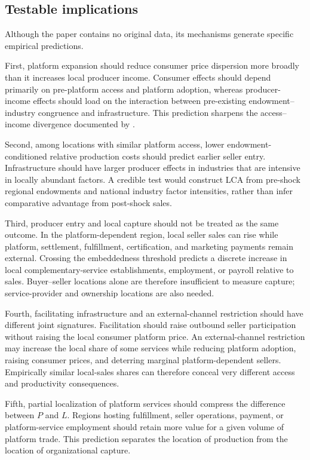 \documentclass[11pt]{article}
\theoremstyle{definition}
\theoremstyle{remark}
\begin{document}
\subsection{Testable implications}

Although the paper contains no original data, its mechanisms generate
specific empirical predictions.

First, platform expansion should reduce consumer price dispersion more
broadly than it increases local producer income.  Consumer effects should
depend primarily on pre-platform access and platform adoption, whereas
producer-income effects should load on the interaction between pre-existing
endowment--industry congruence and infrastructure.  This prediction sharpens
the access--income divergence documented by
\citet{CoutureFaberGuLiu2021}.

Second, among locations with similar platform access, lower
endowment-conditioned relative production costs should predict earlier
seller entry.  Infrastructure should have larger producer effects in
industries that are intensive in locally abundant factors.  A credible test
would construct LCA from pre-shock regional endowments and national industry
factor intensities, rather than infer comparative advantage from post-shock
sales.

Third, producer entry and local capture should not be treated as the same
outcome.  In the platform-dependent region, local seller sales can rise while
platform, settlement, fulfillment, certification, and marketing payments
remain external.  Crossing the embeddedness threshold predicts a discrete
increase in local complementary-service establishments, employment, or
payroll relative to sales.  Buyer--seller locations alone are therefore
insufficient to measure capture; service-provider and ownership locations are
also needed.

Fourth, facilitating infrastructure and an external-channel restriction
should have different joint signatures.  Facilitation should raise outbound
seller participation without raising the local consumer platform price.  An
external-channel restriction may increase the local share of some services
while reducing platform adoption, raising consumer prices, and deterring
marginal platform-dependent sellers.
Empirically similar local-sales shares can therefore conceal very different
access and productivity consequences.

Fifth, partial localization of platform services should compress the
difference between \(P\) and \(L\).  Regions hosting fulfillment, seller
operations, payment, or platform-service employment should retain more value
for a given volume of platform trade.  This prediction separates the location
of production from the location of organizational capture.
\end{document}
